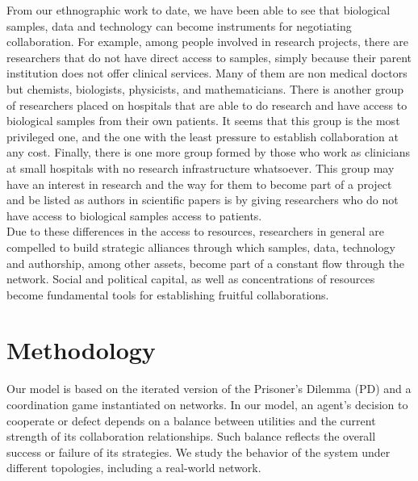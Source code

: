 \documentclass{bmcart}
\begin{document}
From our ethnographic work to date, we have been able to see that
biological samples, data and technology can become instruments for negotiating
collaboration. For example, among people involved in research projects, there
are researchers that do not have direct access to samples, simply because their
parent institution does not offer clinical services. Many of them are non medical
doctors but chemists, biologists, physicists, and mathematicians. There is
another group of researchers placed on hospitals that are able to do
research and have access to biological samples from their own patients. It seems
that this group is the most privileged one, and the one with the least pressure to establish
collaboration at any cost. Finally, there is one more group formed by those
who work as clinicians at small hospitals with no research infrastructure
whatsoever. This group may have an interest in research and the way for them to
become part of a project and be listed as authors in scientific papers is by
giving researchers who do not have access to biological samples access to
patients.\\

Due to these differences in the access to resources, researchers in
general are compelled to build strategic alliances through which samples, data,
technology and authorship, among other assets, become part of a constant flow through
the network. Social and political capital, as well as concentrations of
resources become fundamental tools for establishing fruitful collaborations. 

\section*{Methodology}


Our model is based on the iterated version of the Prisoner's Dilemma (PD) and a
coordination game instantiated on
networks. In our model, an agent's decision to
cooperate or defect depends on a balance between
utilities and the current strength of its collaboration relationships. Such
balance reflects the overall success or failure of its strategies. We
study the behavior of the system under different topologies, including a
real-world network.\\  
\end{document}
